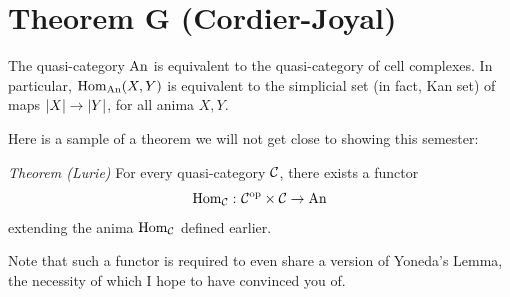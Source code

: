         \section{Theorem G (Cordier-Joyal)}
        The quasi-category $\operatorname{An}$ is equivalent to the quasi-category of cell complexes. In particular, $\operatorname{Hom}_{\operatorname{An}}(X, Y)$ is equivalent to the simplicial set (in fact, Kan set) of maps $\left| X \right| \to \left| Y \right|$, for all anima $X, Y$.
        \medskip

        Here is a sample of a theorem we will not get close to showing this semester:
        \smallskip

        \emph{Theorem (Lurie)}
        For every quasi-category $\mathcal{C}$, there exists a functor
        \begin{equation*}
            \operatorname{Hom}_{\mathcal{C}} \,\colon \mathcal{C}^{\operatorname{op}} \times \mathcal{C} \to \operatorname{An}
        \end{equation*}
        extending the anima $\operatorname{Hom}_{\mathcal{C}}$ defined earlier.
        \smallskip

        Note that such a functor is required to even share a version of Yoneda's Lemma, the necessity of which I hope to have convinced you of.        